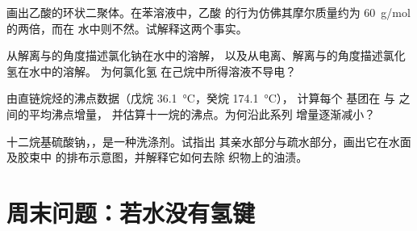 \begin{exercise}[$\star\star$]\label{exo:b1:intermolecular-forces-solvents:9}
画出乙酸的环状二聚体。在苯溶液中，乙酸
的行为仿佛其摩尔质量约为 \qty{60}{g/mol} 的两倍，而在
水中则不然。试解释这两个事实。
\end{exercise}

\begin{exercise}[$\star\star\star$]\label{exo:b1:intermolecular-forces-solvents:10}
从解离与的角度描述氯化钠在水中的溶解，
以及从电离、解离与的角度描述氯化氢在水中的溶解。
为何氯化氢
在己烷中所得溶液不导电？
\end{exercise}

\begin{exercise}[$\star\star\star$]\label{exo:b1:intermolecular-forces-solvents:11}
由直链烷烃的沸点数据（戊烷
\qty{36.1}{\celsius}，癸烷 \qty{174.1}{\celsius}），
计算每个  基团在  与  之间的平均沸点增量，
并估算十一烷的沸点。为何沿此系列
增量逐渐减小？
\end{exercise}

\begin{exercise}[$\star\star\star$]\label{exo:b1:intermolecular-forces-solvents:12}
十二烷基硫酸钠，，是一种洗涤剂。试指出
其亲水部分与疏水部分，画出它在水面及胶束中
的排布示意图，并解释它如何去除
织物上的油渍。
\end{exercise}

\section{周末问题：若水没有氢键}

